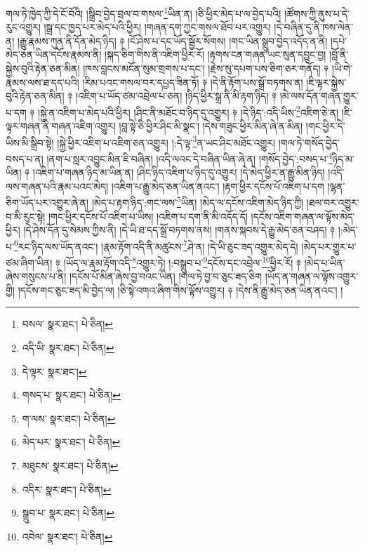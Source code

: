 གལ་ཏེ་ཁྱེད་ཀྱི་དེ་ངོ་བོའི། །སྒྲིབ་བྱེད་བྲལ་བ་གསལ་\footnote{བསལ་  སྣར་ཐང་།  པེ་ཅིན། }ཡིན་ན། །ཅི་ཕྱིར་མེད་པ་ལ་བྱེད་པའི། །ཚོགས་ཀྱི་ནུས་པ་དེ་རུང་འགྱུར། །སྒྲ་དང་ཁྱད་པར་མེད་པའི་ཕྱིར། །གཞན་དག་ཀྱང་གསལ་ཐོབ་པར་འགྱུར། །དེ་བཞིན་དུ་ནི་ཁས་ལེན་ན། །རྒྱུ་རྣམས་ཀུན་ནི་དོན་མེད་ཉིད། ༈ །ངོ་ཤེས་པ་དང་ཡོད་སྦྱོར་སོགས། །གང་ཡིན་སྒྲུབ་བྱེད་འདོད་ན་ནི། །དཔེ་མེད་ཅན་ཡིན་དངོས་རྣམས་ནི། །སྐད་ཅིག་གིས་ནི་འཇིག་ཕྱིར་རོ། །རྟགས་ངན་གཞན་ཡང་སུན་དབྱུང་བྱ། །བློ་ནི་སྐྱེས་བུའི་རྟེན་ཅན་མིན། །ཁས་བླངས་མངོན་སུམ་གྲགས་པ་དང་། །རྗེས་སུ་དཔག་པས་ཅིག་ཅར་གནོད། ༈ །ཡི་གེ་རྣམས་ལས་ཐ་དད་པའི། །རིམ་པའང་གསལ་བར་དཔྱད་ཟིན་ཏོ། ༈ །དེ་ནི་རྟོག་པས་སྒྲོ་བཏགས་ན། །ཇི་ལྟར་སྐྱེས་བུའི་རྟེན་ཅན་མིན། ༈ །འཇིག་པ་ཡོད་ཙམ་འབྲེལ་པ་ཅན། །ཉིད་ཕྱིར་སྒྲ་ནི་མི་རྟག་ཉིད། ༈ །མེ་ལས་དོན་གཞན་གྱུར་པ་དག ༈ །སྐྱེ་ན་འཇིག་པ་མེད་པའི་ཕྱིར། །ཤིང་ནི་མཐོང་བ་ཉིད་དུ་འགྱུར། ༈ །དེ་ཉིད་:འདི་ཡིས་\footnote{འདི་ཡི་  སྣར་ཐང་།  པེ་ཅིན། }འཇིག་ཅེ་ན། །ཇི་ལྟར་གཞན་ནི་གཞན་འཇིག་འགྱུར། །བླ་སྟེ་ཅི་ཕྱིར་ཤིང་མི་སྣང་། །དེས་གཟུང་ཕྱིར་མིན་ཞེ་ན་མིན། །གང་ཕྱིར་དེ་ཡིས་མི་སྒྲིབ་སྟེ། །སྐྱེ་ཕྱིར་འཇིག་པ་འཇིག་ཅན་འགྱུར། །:དེ་ལྟ་\footnote{དེ་ལྟར་  སྣར་ཐང་། }ན་ཡང་ཤིང་མཐོང་འགྱུར། །གལ་ཏེ་གསོད་བྱེད་བསད་པ་ན། །ནག་པ་སླར་འབྱུང་མིན་ཇི་བཞིན། །འདི་ལའང་དེ་བཞིན་ཡིན་ཞེ་ན། །གསོད་བྱེད་:བསད་པ་\footnote{གསད་པ་  སྣར་ཐང་།  པེ་ཅིན། }ཉིད་མ་ཡིན། ༈ །འཇིག་པ་གཞན་ཉིད་མ་ཡིན་ན། །ཤིང་ཉིད་འཇིག་པ་ཉིད་དུ་འགྱུར། །དེ་མེད་ཕྱིར་ན་རྒྱུ་མིན་ཉིད། །འདི་ལས་གཞན་པའི་རྣམ་པའང་མེད། །འཇིག་པ་རྒྱུ་མེད་ཅན་ཡིན་ནའང་། །རྟག་ཕྱིར་དངོས་པོ་འཇིག་པ་དག །ལྷན་ཅིག་ཡོད་པར་འགྱུར་ཞེ་ན། །མེད་པ་རྟག་ཉིད་:གང་ལས་\footnote{ག་ལས་  སྣར་ཐང་།  པེ་ཅིན། }ཡིན། །མེད་ལ་དངོས་འཇིག་མེད་ཉིད་ཀྱི། །ཐལ་བར་འགྱུར་བ་མི་རུང་སྟེ། །གང་ཕྱིར་དངོས་པོ་འཇིག་པ་ཡིས། །འཇིག་པ་དག་ནི་མི་འདོད་དོ། །དངོས་འཇིག་གཞན་ལ་ལྟོས་མེད་ཕྱིར། །དེ་ཤེས་དོན་དུ་སེམས་ཀྱིས་ནི། །དེ་ཡི་ཐ་དད་སྒྲོ་བཏགས་ནས། །གནས་སྐབས་དེ་རྒྱུ་མེད་ཅན་བཤད། ༈ །:མེད་པ་\footnote{མེད་པར་  སྣར་ཐང་།  པེ་ཅིན། }རང་ཉིད་ལས་ཡོད་ནའང་། །རྣམ་རྟོག་འདི་ནི་མཚུངས་\footnote{མཐུངས་  སྣར་ཐང་།  པེ་ཅིན། }ཤེ་ན། །དེ་ཡི་ཅུང་ཟད་འགྱུར་མེད་དེ། །མེད་པར་གྱུར་པ་ཙམ་ཞིག་ཡིན། ༈ །ཡོད་ལ་རྣམ་རྟོག་འདི་\footnote{འདིར་  སྣར་ཐང་།  པེ་ཅིན། }འགྱུར་ཏེ། །:བསྒྲུབ་པ་\footnote{སྒྲུབ་པ་  སྣར་ཐང་།  པེ་ཅིན། }དངོས་དང་འབྲེལ་\footnote{འབེལ་  སྣར་ཐང་།  པེ་ཅིན། }ཕྱིར་རོ། ༈ །མེད་པ་ཡིན་ཞེས་གསུངས་པ་ནི། །དངོས་པོ་མིན་ཞེས་བྱ་བའང་ཡིན། །གལ་ཏེ་བྱ་བ་ཅུང་ཟད་ཅིག །ཡོད་ན་གཞན་ལ་ལྟོས་འགྱུར་གྱི། །དངོས་གང་ཅུང་ཟད་མི་བྱེད་ལ། །ཅི་སྟེ་འགའ་ཞིག་གིས་ལྟོས་འགྱུར། ༈ །དེས་ནི་རྒྱུ་མེད་ཅན་ཡིན་ནའང་། །
